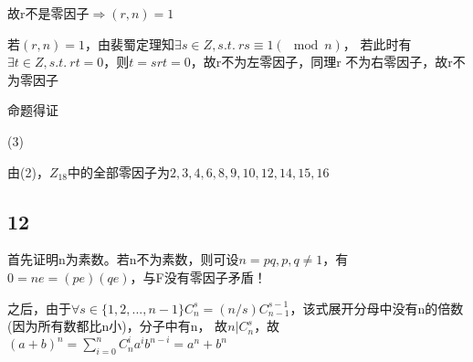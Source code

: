 \documentclass[UTF8]{ctexart}
\begin{document}
故r不是零因子$\Rightarrow (r, n) = 1$

若$(r, n) = 1$，由裴蜀定理知$\exists s\in Z, s.t.\ rs\equiv 1(\mod n)$，
若此时有$\exists t\in Z, s.t.\ rt = 0$，则$t = srt = 0$，故r不为左零因子，同理r
不为右零因子，故r不为零因子

命题得证

(3)

由(2)，$Z_{18}$中的全部零因子为$2, 3, 4, 6, 8, 9, 10, 12, 14, 15, 16$

\subsection*{12}

首先证明n为素数。若n不为素数，则可设$n = pq, p, q\neq 1$，有$0 = ne = (pe)(qe)$，与F没有零因子矛盾！

之后，由于$\forall s\in\{1, 2, ..., n - 1\} C_n^s = (n / s) C_{n - 1}^{s - 1}$，该式展开分母中没有n的倍数(因为所有数都比n小)，分子中有n，
故$n|C_n^s$，故$(a + b)^n = \sum\limits_{i = 0}^n C_n^i a^i b^{n - i} = a^n + b^n$
\end{document}

